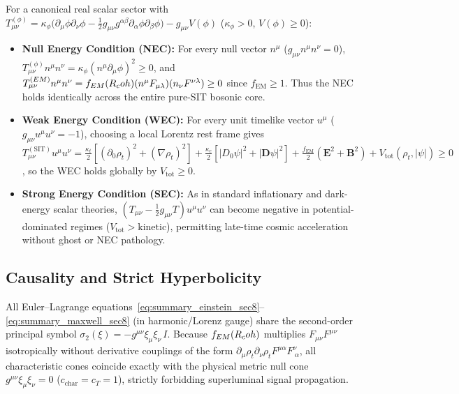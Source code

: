 For a canonical real scalar sector with $T_{\mu\nu}^{(\phi)} = \kappa_\phi\bigl(\partial_\mu\phi\partial_\nu\phi - \frac{1}{2}g_{\mu\nu}g^{\alpha\beta}\partial_\alpha\phi\partial_\beta\phi\bigr) - g_{\mu\nu}V(\phi)$ ($\kappa_\phi > 0$, $V(\phi) \ge 0$):
\begin{itemize}
  \item \textbf{Null Energy Condition (NEC):} For every null vector $n^\mu$ ($g_{\mu\nu}n^\mu n^\nu = 0$), $T_{\mu\nu}^{(\phi)}n^\mu n^\nu = \kappa_\phi(n^\mu\partial_\mu\phi)^2 \ge 0$, and $T_{\mu\nu}^{(EM)}n^\mu n^\nu = f_{EM}(R_coh)(n^\mu F_{\mu\lambda})(n_\nu F^{\nu\lambda}) \ge 0$ since $f_{\mathrm{EM}} \ge 1$. Thus the NEC holds identically across the entire pure-SIT bosonic core.
  \item \textbf{Weak Energy Condition (WEC):} For every unit timelike vector $u^\mu$ ($g_{\mu\nu}u^\mu u^\nu = -1$), choosing a local Lorentz rest frame gives $T_{\mu\nu}^{(\mathrm{SIT})}u^\mu u^\nu = \frac{\kappa_t}{2}[(\partial_0\rho_t)^2 + (\nabla\rho_t)^2] + \frac{\kappa_c}{2}[|D_0\psi|^2 + |\mathbf{D}\psi|^2] + \frac{f_{\mathrm{EM}}}{2}(\mathbf{E}^2 + \mathbf{B}^2) + V_{\mathrm{tot}}(\rho_t,|\psi|) \ge 0$, so the WEC holds globally by $V_{\mathrm{tot}} \ge 0$.
  \item \textbf{Strong Energy Condition (SEC):} As in standard inflationary and dark-energy scalar theories, $(T_{\mu\nu} - \frac{1}{2}g_{\mu\nu}T)u^\mu u^\nu$ can become negative in potential-dominated regimes ($V_{\mathrm{tot}} > \text{kinetic}$), permitting late-time cosmic acceleration without ghost or NEC pathology.
\end{itemize}

\subsection{Causality and Strict Hyperbolicity}

All Euler--Lagrange equations~\eqref{eq:summary_einstein_sec8}--\eqref{eq:summary_maxwell_sec8} (in harmonic/Lorenz gauge) share the second-order principal symbol $\sigma_2(\xi) = -g^{\mu\nu}\xi_\mu\xi_\nu\,I$. Because $f_{EM}(R_coh)$ multiplies $F_{\mu\nu}F^{\mu\nu}$ isotropically without derivative couplings of the form $\partial_\mu\rho_t\partial_\nu\rho_t F^{\mu\alpha}F^\nu_{\ \alpha}$, all characteristic cones coincide exactly with the physical metric null cone $g^{\mu\nu}\xi_\mu\xi_\nu = 0$ ($c_{\mathrm{char}} = c_T = 1$), strictly forbidding superluminal signal propagation.

